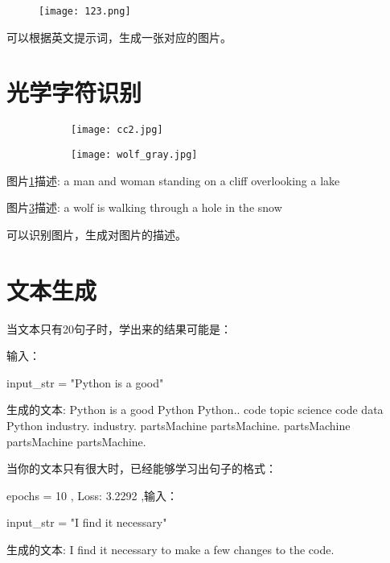 \documentclass{article}
\begin{document}
\begin{figure}[h!]
    \centering
    \texttt{[image: 123.png]}

\end{figure}

可以根据英文提示词，生成一张对应的图片。


\newpage


\section{光学字符识别}




\begin{figure}[h!]
    \centering
    \begin{subfigure}{0.4\textwidth}
        \centering
        \texttt{[image: cc2.jpg]}
        \caption{}
        \label{fig:subfig3}
    \end{subfigure}
    \hfill
    \begin{subfigure}{0.4\textwidth}
        \centering  
        \texttt{[image: wolf\_gray.jpg]}
        \caption{}
        \label{fig:subfig4}
    \end{subfigure}

\end{figure}

图片\ref{fig:subfig3}描述: a man and woman standing on a cliff overlooking a lake

图片\ref{fig:subfig4}描述: a wolf is walking through a hole in the snow

可以识别图片，生成对图片的描述。

\section{文本生成}

当文本只有20句子时，学出来的结果可能是：

输入：

input\_str = "Python is a good"

生成的文本: Python is a good Python Python.. code topic science code data Python industry. industry. 
partsMachine partsMachine. partsMachine partsMachine partsMachine. 


当你的文本只有很大时，已经能够学习出句子的格式：

epochs = 10 , Loss: 3.2292 ,输入：

input\_str = "I find it necessary"

生成的文本: I find it necessary to make a few changes to the code.
\end{document}
